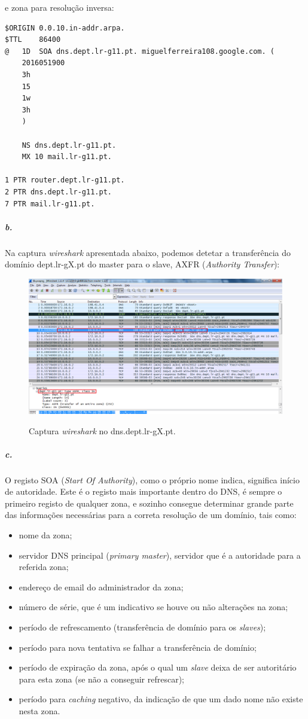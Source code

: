 e zona para resolução inversa:

\begin{verbatim}
$ORIGIN	0.0.10.in-addr.arpa.
$TTL	86400
@	1D	SOA dns.dept.lr-g11.pt.	miguelferreira108.google.com. (
	2016051900
	3h
	15
	1w
	3h
	)

	NS dns.dept.lr-g11.pt.
	MX 10 mail.lr-g11.pt.

1 PTR router.dept.lr-g11.pt.
2 PTR dns.dept.lr-g11.pt.
7 PTR mail.lr-g11.pt.
\end{verbatim}

\newpage
\subparagraph{b.}
Na captura \emph{wireshark} apresentada abaixo, podemos detetar a transferência do domínio \textsf{dept.lr-gX.pt} do \textsf{master} para o \textsf{slave}, \textsf{AXFR} (\emph{Authority Transfer}):

\begin{figure}[h]
\centering
\includegraphics[width=1\textwidth, height=0.38\textheight]{6b_cap.png}
\label{fig:2-capturaWireshark}
\caption{Captura \emph{wireshark} no \textsf{dns.dept.lr-gX.pt}.}
\end{figure}


\subparagraph{c.}
O registo SOA (\emph{Start Of Authority}), como o próprio nome indica, significa início de autoridade. Este é o registo mais importante dentro do DNS, é sempre o primeiro registo de qualquer zona, e sozinho consegue determinar grande parte das informações necessárias para a correta resolução de um domínio, tais como:
\begin{itemize}
\item nome da zona;
\item servidor DNS principal (\emph{primary master}), servidor que é a autoridade para a referida zona;
\item endereço de email do administrador da zona;
\item número de série, que é um indicativo se houve ou não alterações na zona;
\item período de refrescamento (transferência de domínio para os \emph{slaves});
\item período para nova tentativa se falhar a transferência de domínio;
\item período de expiração da zona, após o qual um \emph{slave} deixa de ser autoritário para esta zona (se não a conseguir refrescar);
\item período para \emph{caching} negativo, da indicação de que um dado nome não existe nesta zona.
\end{itemize}

